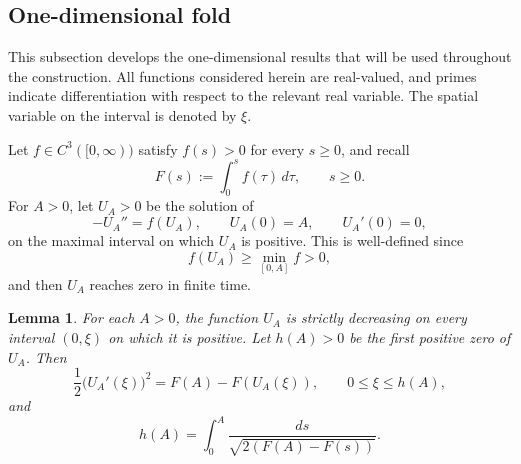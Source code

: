 \documentclass[reqno,12pt]{amsart}
\numberwithin{equation}{section}
\newtheorem{lemma}[theorem]{Lemma}
\theoremstyle{remark}
\begin{document}

\subsection{One-dimensional fold}\label{sec:fold-theory}

This subsection develops the one-dimensional results that will be used throughout the construction. All functions considered herein are real-valued, and primes indicate differentiation with respect to the relevant real variable. The spatial variable on the interval is denoted by $\xi$.

 

Let $f\in C^3([0,\infty))$ satisfy $f(s)>0$ for every $s\ge0$, and recall 
$$
F(s):=\int_0^s f(\tau)\,d\tau, \qquad s\ge 0.
$$
For $A>0$, let $U_A>0$ be the solution of
$$
-U_A''=f(U_A),\qquad U_A(0)=A,\qquad U_A'(0)=0,
$$
on the maximal interval on which $U_A$ is positive. This is well-defined since $$f(U_A)\ge \min_{[0,A]} f>0,$$
and then $U_A$ reaches zero in finite time.  

\begin{lemma} \label{lem:time-map}
For each $A>0$, the function $U_A$ is strictly decreasing on every interval $(0,\xi)$ on which it is positive.  Let $h(A)>0$ be the first positive zero of $U_A$. Then
\begin{equation}\label{eq:FU}
 \frac 1 2\bigl(U_A'(\xi)\bigr)^2=F(A)-F(U_A(\xi)),
\qquad 0\le \xi\le h(A),   
\end{equation}
and
$$
h(A)=\int_0^A\frac{ds}{\sqrt{2(F(A)-F(s))}}.
$$
\end{lemma}
\end{document}
